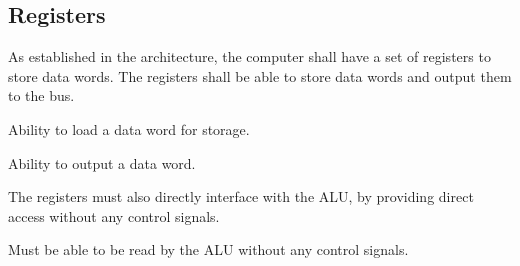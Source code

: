 \subsection{Registers}
As established in the architecture, the computer shall have a set of registers to store data words. The registers shall be able to store data words and output them to the bus.

\begin{feat-requirement}
  Ability to load a data word for storage.
\end{feat-requirement}

\begin{feat-requirement}
  Ability to output a data word.
\end{feat-requirement}

The registers must also directly interface with the ALU, by providing direct access without any control signals. 

\begin{arch-requirement} \label{req:register-direct-access}
  Must be able to be read by the ALU without any control signals.
\end{arch-requirement}